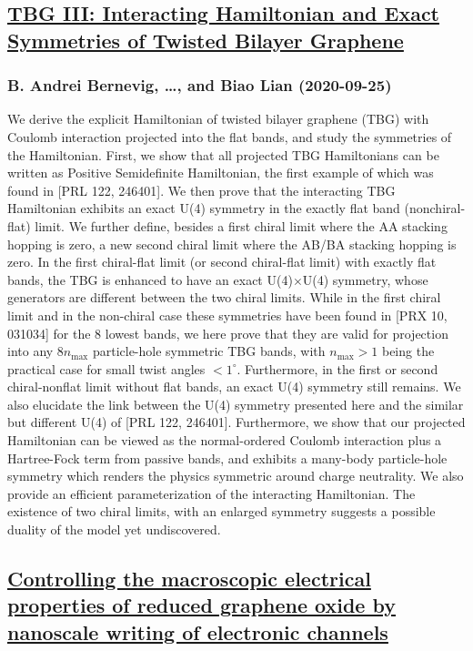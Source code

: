 \subsection*{\href{http://arxiv.org/abs/2009.12376v1}{TBG III: Interacting Hamiltonian and Exact Symmetries of Twisted Bilayer  Graphene}}
\subsubsection*{B. Andrei Bernevig, \dots, and Biao Lian (2020-09-25)}
We derive the explicit Hamiltonian of twisted bilayer graphene (TBG) with
Coulomb interaction projected into the flat bands, and study the symmetries of
the Hamiltonian. First, we show that all projected TBG Hamiltonians can be
written as Positive Semidefinite Hamiltonian, the first example of which was
found in [PRL 122, 246401]. We then prove that the interacting TBG Hamiltonian
exhibits an exact U(4) symmetry in the exactly flat band (nonchiral-flat)
limit. We further define, besides a first chiral limit where the AA stacking
hopping is zero, a new second chiral limit where the AB/BA stacking hopping is
zero. In the first chiral-flat limit (or second chiral-flat limit) with exactly
flat bands, the TBG is enhanced to have an exact U(4)$\times$U(4) symmetry,
whose generators are different between the two chiral limits. While in the
first chiral limit and in the non-chiral case these symmetries have been found
in [PRX 10, 031034] for the $8$ lowest bands, we here prove that they are valid
for projection into any $8 n_\text{max}$ particle-hole symmetric TBG bands,
with $n_\text{max}>1$ being the practical case for small twist angles
$<1^\circ$. Furthermore, in the first or second chiral-nonflat limit without
flat bands, an exact U(4) symmetry still remains. We also elucidate the link
between the U(4) symmetry presented here and the similar but different U(4) of
[PRL 122, 246401]. Furthermore, we show that our projected Hamiltonian can be
viewed as the normal-ordered Coulomb interaction plus a Hartree-Fock term from
passive bands, and exhibits a many-body particle-hole symmetry which renders
the physics symmetric around charge neutrality. We also provide an efficient
parameterization of the interacting Hamiltonian. The existence of two chiral
limits, with an enlarged symmetry suggests a possible duality of the model yet
undiscovered.

\subsection*{\href{http://arxiv.org/abs/2009.12366v1}{Controlling the macroscopic electrical properties of reduced graphene  oxide by nanoscale writing of electronic channels}}
